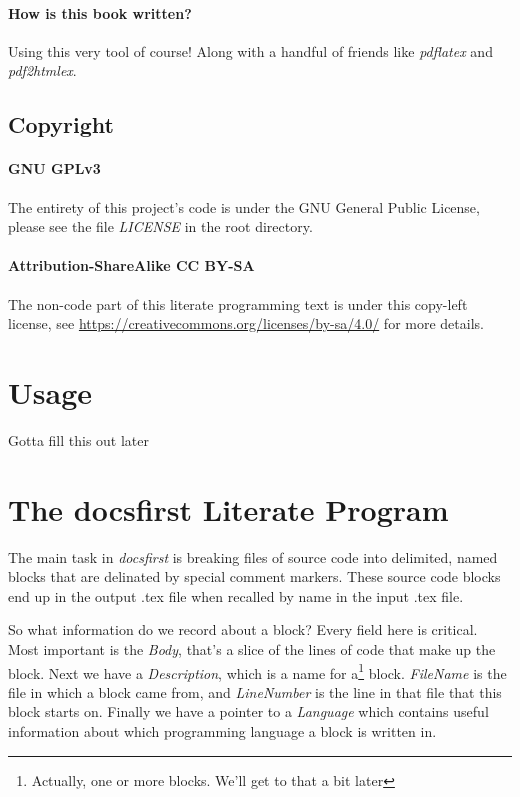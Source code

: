 \documentclass{article}
\begin{document}
\paragraph{How is this book written?} Using this very tool of course! Along with
a handful of friends like \emph{pdflatex} and \emph{pdf2htmlex}.

\subsection{Copyright}

\paragraph{GNU GPLv3} The entirety of this project's code is under the GNU
General Public License, please see the file \emph{LICENSE} in the root
directory.


\paragraph{Attribution-ShareAlike CC BY-SA} The non-code part of this
literate programming text is under this copy-left license, see
\url{https://creativecommons.org/licenses/by-sa/4.0/} for more details.

\section{Usage}

Gotta fill this out later

\section{The docsfirst Literate Program}

The main task in \emph{docsfirst} is breaking files of source code into delimited,
named blocks that are delinated by special comment markers. These source code
blocks end up in the output .tex file when recalled by name in the input .tex
file.


So what information do we record about a block? Every field here is critical.
Most important is the \emph{Body}, that's a slice of the lines of code that make
up the block. Next we have a \emph{Description}, which is a name for
a\footnote{Actually, one or more blocks. We'll get to that a bit later} block.
\emph{FileName} is the file in which a block came from, and \emph{LineNumber}
is the line in that file that this block starts on. Finally we have a pointer to
a \emph{Language} which contains useful information about which programming
language a block is written in.
\end{document}
